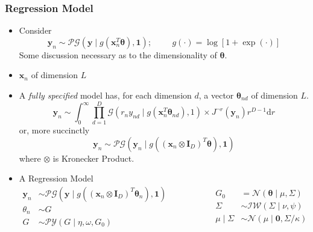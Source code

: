 \documentclass[aspectratio=169,10pt,notes]{beamer}
\begin{document}
\begin{frame}
    \frametitle{Regression Model}
    {\footnotesize 
    \begin{itemize}
        \item Consider
        \[
            \bm{y}_n \sim \mathcal{PG}(\bm{y}\mid g(\bm{x}_n^T\bm{\theta}), \bm{1});
            \hspace{1cm}
            g(\cdot) = \log[1 + \exp(\cdot)]
        \]
        Some discussion necessary as to the dimensionality of $\bm{\theta}$.
        \item $\bm{x}_n$ of dimension $L$
        \item A \emph{fully specified} model has, for each dimension $d$, a vector $\bm{\theta}_{nd}$ of dimension $L$.
        \[
        \bm{y}_n \sim \int_0^{\infty}
            \prod_{d = 1}^D \mathcal{G}\left(r_ny_{nd}\mid 
                g(\bm{x}_n^T\bm{\theta}_{nd}), 1\right) \times J^{\neg r}(\bm{y}_n) r^{D-1}\text{d}r 
        \]
        or, more succinctly
        \[
        \bm{y}_n \sim \mathcal{PG}\left(\bm{y}_n \mid g((\bm{x}_n 
            \otimes \bm{I}_{D})^T\bm{\theta}), \bm{1}\right)
        \]
        where $\otimes$ is Kronecker Product.
        \item A Regression Model
        \[
        \begin{aligned}
            \bm{y}_n &\sim \mathcal{PG}\left(\bm{y}\mid 
                g\left((\bm{x}_n\otimes\bm{I}_D)^T\bm{\theta}_n\right), \bm{1}\right)\\
            \theta_n &\sim G\\
            G &\sim \mathcal{PY}(G\mid\eta, \omega, G_0)
        \end{aligned}
        ~\hspace{2cm}
        \begin{aligned}
            G_0 &= \mathcal{N}(\bm{\theta} \mid \mu, \Sigma)\\
            \Sigma &\sim \mathcal{IW}(\Sigma\mid \nu, \psi)\\
            \mu\mid\Sigma &\sim \mathcal{N}(\mu\mid \bm{0}, \Sigma / \kappa)
        \end{aligned}
        \]
    \end{itemize}
    }
\end{frame} %
\end{document}
